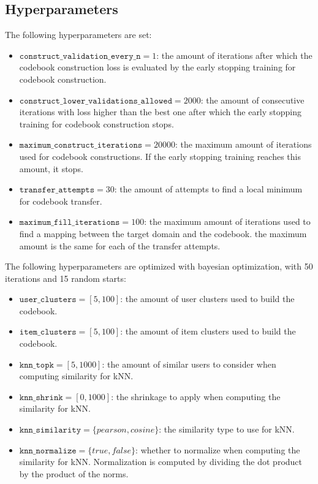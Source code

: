 \subsection{Hyperparameters}

The following hyperparameters are set:
\begin{itemize}
\item $\texttt{construct\_validation\_every\_n} = 1$: the amount of iterations after which the codebook construction loss is evaluated by the early stopping training for codebook construction.
\item $\texttt{construct\_lower\_validations\_allowed} = 2000$: the amount of consecutive iterations with loss higher than the best one after which the early stopping training for codebook construction stops.
\item $\texttt{maximum\_construct\_iterations} = 20000$: the maximum amount of iterations used for codebook constructions. If the early stopping training reaches this amount, it stops.
\item $\texttt{transfer\_attempts} = 30$: the amount of attempts to find a local minimum for codebook transfer.
\item $\texttt{maximum\_fill\_iterations} = 100$: the maximum amount of iterations used to find a mapping between the target domain and the codebook. the maximum amount is the same for each of the transfer attempts.
\end{itemize}
The following hyperparameters are optimized with bayesian optimization, with 50 iterations and 15 random starts:
\begin{itemize}
\item $\texttt{user\_clusters} = [5,100]$: the amount of user clusters used to build the codebook.
\item $\texttt{item\_clusters} = [5,100]$: the amount of item clusters used to build the codebook.
\item $\texttt{knn\_topk} = [5,1000]$: the amount of similar users to consider when computing similarity for kNN.
\item $\texttt{knn\_shrink} = [0,1000]$: the shrinkage to apply when computing the similarity for kNN.
\item $\texttt{knn\_similarity} = \{pearson,cosine\}$: the similarity type to use for kNN.
\item $\texttt{knn\_normalize} = \{true,false\}$: whether to normalize when computing the similarity for kNN. Normalization is computed by dividing the dot product by the product of the norms.
\end{itemize}


